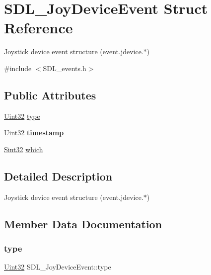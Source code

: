 \hypertarget{struct_s_d_l___joy_device_event}{}\section{S\+D\+L\+\_\+\+Joy\+Device\+Event Struct Reference}
\label{struct_s_d_l___joy_device_event}


Joystick device event structure (event.\+jdevice.$\ast$)  




{\ttfamily \#include $<$S\+D\+L\+\_\+events.\+h$>$}

\subsection*{Public Attributes}
\begin{DoxyCompactItemize}
\item 
\hyperlink{_s_d_l__stdinc_8h_add440eff171ea5f55cb00c4a9ab8672d}{Uint32} \hyperlink{struct_s_d_l___joy_device_event_a51f060ba1dd5669b458e9c97aece667e}{type}
\item 
\mbox{\label{struct_s_d_l___joy_device_event_a5c4a9271bfff5d5c2e09a0dc732df8f3}} 
\hyperlink{_s_d_l__stdinc_8h_add440eff171ea5f55cb00c4a9ab8672d}{Uint32} {\bfseries timestamp}
\item 
\hyperlink{_s_d_l__stdinc_8h_a7a90b941db9d4582e9ad7abb9940ff7e}{Sint32} \hyperlink{struct_s_d_l___joy_device_event_af9b295798f033b799ebbda7de6cb5a7e}{which}
\end{DoxyCompactItemize}


\subsection{Detailed Description}
Joystick device event structure (event.\+jdevice.$\ast$) 

\subsection{Member Data Documentation}
\mbox{\label{struct_s_d_l___joy_device_event_a51f060ba1dd5669b458e9c97aece667e}} 
\subsubsection{\texorpdfstring{type}{type}}
{\footnotesize\ttfamily \hyperlink{_s_d_l__stdinc_8h_add440eff171ea5f55cb00c4a9ab8672d}{Uint32} S\+D\+L\+\_\+\+Joy\+Device\+Event\+::type}

